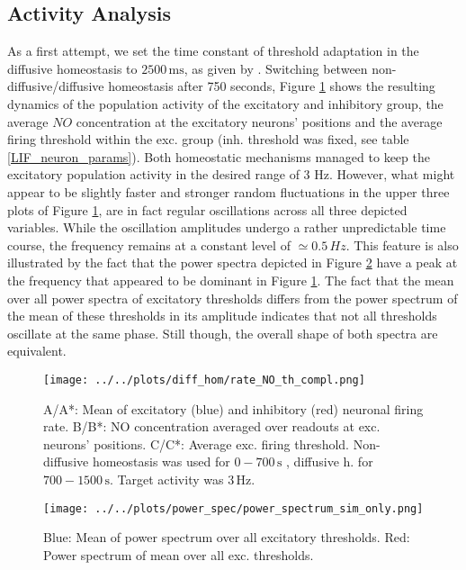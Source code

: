 \documentclass[10pt,a4paper]{article}
\begin{document}
\subsection{Activity Analysis} \label{activ_analys}
As a first attempt, we set the time constant of threshold adaptation in the diffusive homeostasis to $\mathrm{2500\, ms}$, as given by \cite{Sweeney_Paper}. Switching between non-diffusive/diffusive homeostasis after 750 seconds, Figure \ref{full_sim_osci} shows the resulting dynamics of the population activity of the excitatory and inhibitory group, the average $NO$ concentration at the excitatory neurons' positions and the average firing threshold within the exc. group (inh. threshold was fixed, see table \ref{LIF_neuron_params}). Both homeostatic mechanisms managed to keep the excitatory population activity in the desired range of 3 Hz. However, what might appear to be slightly faster and stronger random fluctuations in the upper three plots of Figure \ref{full_sim_osci}, are in fact regular oscillations across all three depicted variables. While the oscillation amplitudes undergo a rather unpredictable time course, the frequency remains at a constant level of $\simeq 0.5\, Hz$. This feature is also illustrated by the fact that the power spectra depicted in Figure \ref{Power_Spec_without_Analysis} have a peak at the frequency that appeared to be dominant in Figure \ref{full_sim_osci}. The fact that the mean over all power spectra of excitatory thresholds differs from the power spectrum of the mean of these thresholds in its amplitude indicates that not all thresholds oscillate at the same phase. Still though, the overall shape of both spectra are equivalent. 
\begin{figure}
\begin{center}
\texttt{[image: ../../plots/diff\_hom/rate\_NO\_th\_compl.png]}
\end{center}
\caption{A/A*: Mean of excitatory (blue) and inhibitory (red) neuronal firing rate. B/B*: NO concentration averaged over readouts at exc. neurons' positions. C/C*: Average exc. firing threshold. Non-diffusive homeostasis was used for $\mathrm{0-700\, s}$ , diffusive h. for $\mathrm{700-1500\, s}$. Target activity was $\mathrm{3\, Hz}$.}
\label{full_sim_osci}
\end{figure}
\begin{figure}
\begin{center}
\texttt{[image: ../../plots/power\_spec/power\_spectrum\_sim\_only.png]}
\caption{Blue: Mean of power spectrum over all excitatory thresholds. Red: Power spectrum of mean over all exc. thresholds.}
\label{Power_Spec_without_Analysis}
\end{center}
\end{figure}
\end{document}
